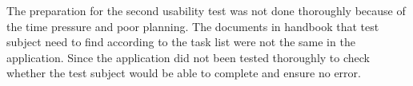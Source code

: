 The preparation for the second usability test was not done thoroughly because of the time pressure and poor planning. 
The documents in handbook that test subject need to find according to the task list were not the same in the application. 
Since the application did not been tested thoroughly to check whether the test subject would be able to complete and ensure no error. 



